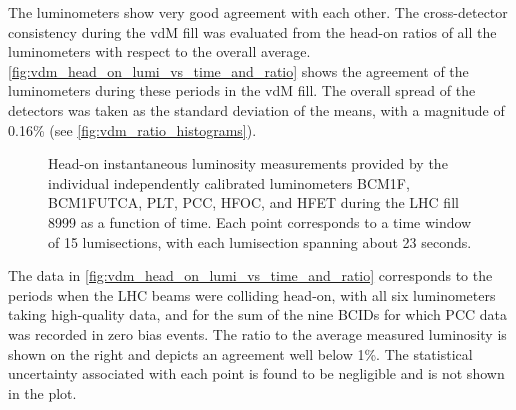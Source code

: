 The luminometers show very good agreement with each other. The cross-detector consistency during the vdM fill was evaluated from the head-on ratios of all the luminometers with respect to the overall average. \autoref{fig:vdm_head_on_lumi_vs_time_and_ratio} shows the agreement of the luminometers during these periods in the vdM fill. The overall spread of the detectors was taken as the standard deviation of the means, with a magnitude of 0.16\% (see \autoref{fig:vdm_ratio_histograms}).

\begin{figure}[!htb]
	\centering
	\caption[Comparison of head-on luminosity measurements]{Head-on instantaneous luminosity measurements provided by the individual independently calibrated luminometers BCM1F, BCM1FUTCA, PLT, PCC, HFOC, and HFET during the LHC fill 8999 as a function of time. Each point corresponds to a time window of 15 lumisections, with each lumisection spanning about 23 seconds.}
	\label{fig:vdm_head_on_lumi_vs_time_and_ratio}
\end{figure}

The data in \autoref{fig:vdm_head_on_lumi_vs_time_and_ratio} corresponds to the periods when the LHC beams were colliding head-on, with all six luminometers taking high-quality data, and for the sum of the nine BCIDs for which PCC data was recorded in zero bias events. The ratio to the average measured luminosity is shown on the right and depicts an agreement well below 1\%. The statistical uncertainty associated with each point is found to be negligible and is not shown in the plot.


